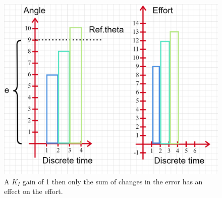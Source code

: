 \begin{figure}[H]
    \centering
    \includegraphics[width=\textwidth]{Figures/Technical_figures/IGAIN.png} 
    \caption{A $K_I$ gain of 1 then only the sum of changes in the error has an effect on the effort.}
    \label{fig:IGain}
\end{figure}
